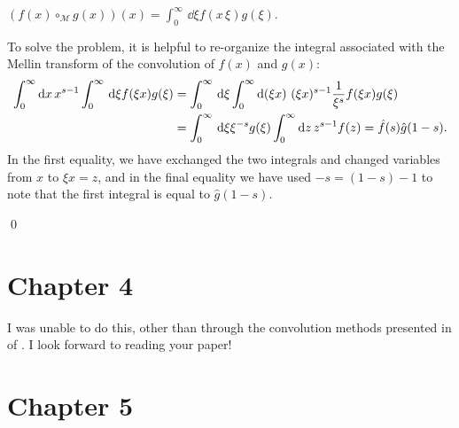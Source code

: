 \(
    (f(x) \circ_{\mathcal M} g(x))(x)
    =
    \int_0^\infty\,\dd\xi f(x\,\xi) g(\xi)
    .
\)


To solve the problem, it is helpful to re-organize the integral associated with the Mellin transform of the convolution of \(f(x)\) and \(g(x)\):
\begin{align}
    \int_0^\infty \dd x\, x^{s-1}
    \int_0^\infty \, \dd \xi
    f(\xi x) g(\xi)
    &=
    \int_0^\infty \, \dd \xi
    \int_0^\infty \dd (\xi x)\, (\xi x)^{s-1}
    \frac{1}{\xi^s}
    f(\xi x) g(\xi)
    \\
    \notag
    &=
    \int_0^\infty \, \dd \xi
    \xi^{-s}
    g(\xi)
    \int_0^\infty \dd z\, z^{s-1}
    f(z)
    =
    \hat{f}(s) \hat{g}(1-s)
    .
\end{align}
In the first equality, we have exchanged the two integrals and changed variables from \(x\) to \(\xi x = z\), and in the final equality we have used \(-s = (1-s) - 1\) to note that the first integral is equal to \(\hat{g}(1-s)\).

\qed{}



\section*{Chapter 4}





I was unable to do this, other than through the convolution methods presented in  of .
%
I look forward to reading your paper!



\section*{Chapter 5}

